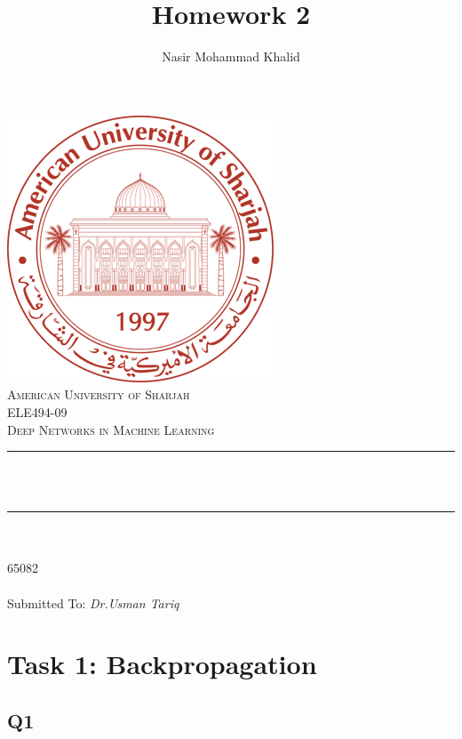 \documentclass[a4paper, 12pt]{article}
\title{Homework 2}
\author{Nasir Mohammad Khalid}
\makeatletter
\let\thetitle\@title
\let\theauthor\@author
\let\thedate\@date
\makeatother
\begin{document}
 
    \begin{titlepage}
        \centering
        \vspace*{0.5 cm}
        \includegraphics[scale = 0.60]{logo.png}\\[1.0 cm]	%
        \textsc{\LARGE American University of Sharjah}\\[1.0 cm]
        \textsc{\Large ELE494-09}\\[0.2 cm]	
        \textsc{\Large Deep Networks in Machine Learning}\\[0.5 cm]			%
        \rule{\linewidth}{0.2 mm} \\[0.4 cm]
        { \huge \bfseries \thetitle}\\
        \rule{\linewidth}{0.2 mm} \\[1.5 cm]
        
        \textsc{\Large{\theauthor}}\\[0.3 cm]
        \textsc{\Large{65082}}\\[0.3 cm]
        \textsc{\Large{\thedate}}\\[1.5 cm]

        \textmd{Submitted To: \itshape{Dr.Usman Tariq}}
    \end{titlepage}

    \clearpage
    \tableofcontents
    \listoffigures
    \lstlistoflistings
    \clearpage

    \section{Task 1: Backpropagation}

    \subsection{Q1}
\end{document}
